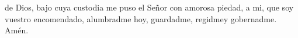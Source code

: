 de Dios, bajo cuya custodia me puso el Señor con amorosa piedad, a mi, que soy vuestro encomendado, alumbradme hoy,
guardadme, regidmey gobernadme. Amén.